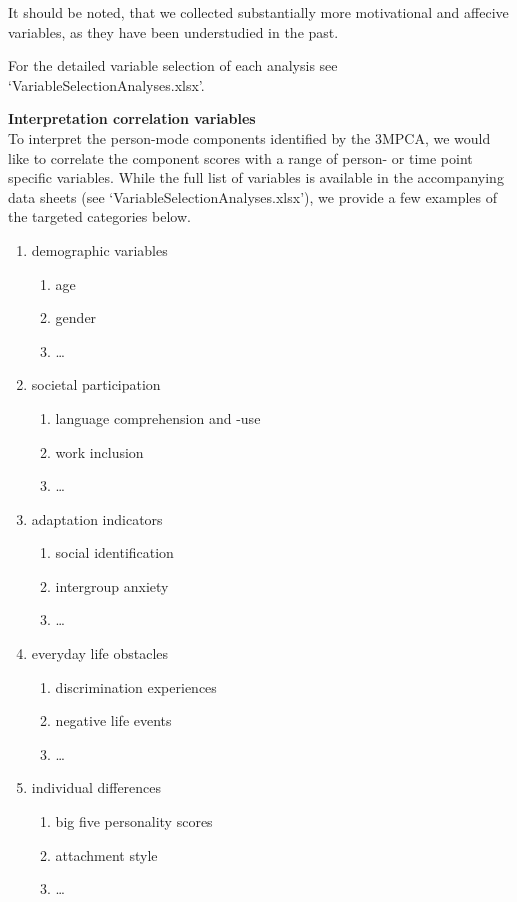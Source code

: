 \documentclass[]{article}
\providecommand{\tightlist}{%
\setlength{\itemsep}{0pt}\setlength{\parskip}{0pt}}
\begin{document}
It should be noted, that we collected substantially more motivational
and affecive variables, as they have been understudied in the past.

For the detailed variable selection of each analysis see
`VariableSelectionAnalyses.xlsx'.

\textbf{Interpretation correlation variables}\\
To interpret the person-mode components identified by the 3MPCA, we
would like to correlate the component scores with a range of person- or
time point specific variables. While the full list of variables is
available in the accompanying data sheets (see
`VariableSelectionAnalyses.xlsx'), we provide a few examples of the
targeted categories below.

\begin{enumerate}
\def\labelenumi{\arabic{enumi}.}
\tightlist
\item
  demographic variables

  \begin{enumerate}
  \def\labelenumii{\alph{enumii}.}
  \tightlist
  \item
    age
  \item
    gender
  \item
    \ldots{}
  \end{enumerate}
\item
  societal participation

  \begin{enumerate}
  \def\labelenumii{\alph{enumii}.}
  \tightlist
  \item
    language comprehension and -use
  \item
    work inclusion
  \item
    \ldots{}
  \end{enumerate}
\item
  adaptation indicators

  \begin{enumerate}
  \def\labelenumii{\alph{enumii}.}
  \tightlist
  \item
    social identification
  \item
    intergroup anxiety
  \item
    \ldots{}
  \end{enumerate}
\item
  everyday life obstacles

  \begin{enumerate}
  \def\labelenumii{\alph{enumii}.}
  \tightlist
  \item
    discrimination experiences
  \item
    negative life events
  \item
    \ldots{}
  \end{enumerate}
\item
  individual differences

  \begin{enumerate}
  \def\labelenumii{\alph{enumii}.}
  \tightlist
  \item
    big five personality scores
  \item
    attachment style
  \item
    \ldots{}
  \end{enumerate}
\end{enumerate}
\end{document}
